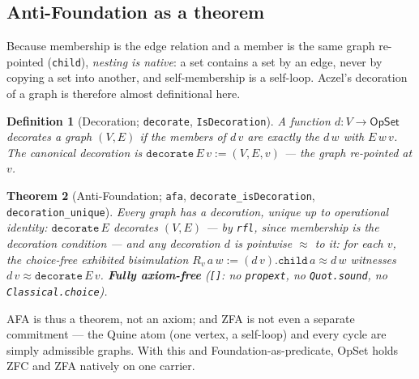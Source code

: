 \documentclass[11pt]{article}
\newtheorem{thm}{Theorem}[section]
\newtheorem{defn}[thm]{Definition}
\theoremstyle{remark}
\newcommand{\OpSet}{\textsf{OpSet}}
\newcommand{\eq}{\approx}
\begin{document}
\subsection{Anti-Foundation as a theorem}
Because membership is the edge relation and a member is the same graph re-pointed
(\texttt{child}), \emph{nesting is native}: a set contains a set by an edge, never by copying a set
into another, and self-membership is a self-loop. Aczel's decoration of a graph is therefore almost
definitional here.
\begin{defn}[Decoration; \texttt{decorate}, \texttt{IsDecoration}]
A function $d:V\to\OpSet$ decorates a graph $(V,E)$ if the members of $d\,v$ are exactly the
$d\,w$ with $E\,w\,v$. The canonical decoration is $\texttt{decorate}\,E\,v:=(V,E,v)$ --- the graph
re-pointed at $v$.
\end{defn}
\begin{thm}[Anti-Foundation; \texttt{afa}, \texttt{decorate\_isDecoration}, \texttt{decoration\_unique}]
Every graph has a decoration, unique up to operational identity: $\texttt{decorate}\,E$ decorates
$(V,E)$ --- by \texttt{rfl}, since membership \emph{is} the decoration condition --- and any
decoration $d$ is pointwise $\eq$ to it: for each $v$, the choice-free \emph{exhibited} bisimulation
$R_v\,a\,w:=(d\,v).\texttt{child}\,a\eq d\,w$ witnesses $d\,v\eq\texttt{decorate}\,E\,v$.
\textbf{Fully axiom-free} (\texttt{[]}: no \texttt{propext}, no \texttt{Quot.sound}, no
\texttt{Classical.choice}).
\end{thm}
AFA is thus a theorem, not an axiom; and ZFA is not even a separate commitment --- the Quine atom
(one vertex, a self-loop) and every cycle are simply admissible graphs. With this and
Foundation-as-predicate, \OpSet{} holds ZFC and ZFA natively on one carrier.
\end{document}
